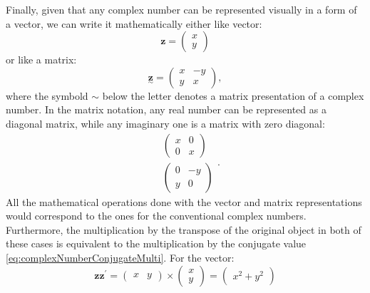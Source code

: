 \documentclass[
]{book}
\begin{document}
Finally, given that any complex number can be represented visually in a form of a vector, we can write it mathematically either like vector:
\begin{equation}
    \boldsymbol{z} = \begin{pmatrix} x \\ y \end{pmatrix}
    \label{eq:complexNumberVectors}
\end{equation}
or like a matrix:
\begin{equation}
    \underset{\sim}{\boldsymbol{z}} = \begin{pmatrix} x & -y \\ y & x \end{pmatrix} ,
    \label{eq:complexNumberMatrix}
\end{equation}
where the symbold \(\sim\) below the letter denotes a matrix presentation of a complex number. In the matrix notation, any real number can be represented as a diagonal matrix, while any imaginary one is a matrix with zero diagonal:
\begin{equation*}
    \begin{aligned}
        & \begin{pmatrix} x & 0 \\ 0 & x \end{pmatrix} \\
        & \begin{pmatrix} 0 & -y \\ y & 0 \end{pmatrix}
    \end{aligned} .
\end{equation*}
All the mathematical operations done with the vector and matrix representations would correspond to the ones for the conventional complex numbers. Furthermore, the multiplication by the transpose of the original object in both of these cases is equivalent to the multiplication by the conjugate value \eqref{eq:complexNumberConjugateMulti}. For the vector:
\begin{equation}
    \boldsymbol{z} \boldsymbol{z}^\prime = \begin{pmatrix} x & y \end{pmatrix} \times \begin{pmatrix} x \\ y \end{pmatrix} = \begin{pmatrix} x^2 + y^2 \end{pmatrix}
    \label{eq:complexNumberVectorsMulti}
\end{equation}
\end{document}

